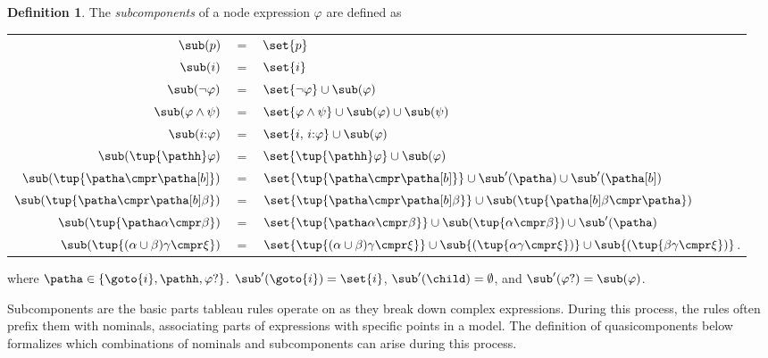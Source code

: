\documentclass[10pt,a4paper]{amsart}
\theoremstyle{definition}
\newtheorem{defi}[thm]{Definition}
\theoremstyle{remark}
\begin{document}
\begin{defi} \label{def:subformulas}
    The \emph{subcomponents} of a node expression $\varphi$ are defined as
        \begin{longtable}{r@{\ }c@{\ }l}
            $\sub(p)$
            & $=$ & $\set{p}$ \\
            $\sub(i)$
            & $=$ & $\set{i}$ \\
            $\sub(\lnot \varphi)$
            & $=$ & $\set{\lnot \varphi} \cup \sub(\varphi)$ \\
            $\sub(\varphi \land \psi)$
            & $=$ & $\set{\varphi \land \psi} \cup \sub(\varphi) \cup \sub({\psi})$  \\            
            $\sub(i{:}\varphi)$
            & $=$ & $\set{i,\, i{:}\varphi} \cup \sub(\varphi)$ \\
            $\sub(\tup{\pathh} \varphi)$ 
            & $=$ & $\set{ \tup{\pathh} \varphi} \cup \sub(\varphi)$ \\  
            $\sub(\tup{ \patha \cmpr \patha[b] })$
            & $=$ & $\set{\tup{ \patha \cmpr \patha[b]}} \cup \sub'(\patha) \cup \sub'(\patha[b])$ \\
            $\sub(\tup{\patha \cmpr \patha[b]\beta})$
            & $=$ & $\set{\tup{\patha \cmpr \patha[b]\beta}} \cup \sub(\tup{\patha[b]\beta \cmpr \patha})$ \\
            $\sub(\tup{\patha\alpha \cmpr \beta})$
            & $=$ & $\set{\tup{\patha\alpha \cmpr \beta}} \cup \sub(\tup{\alpha \cmpr \beta}) \cup \sub'(\patha)$ \\
            $\sub(\tup{ (\alpha \cup \beta) \gamma \cmpr \xi })$
            & $=$ & $\set{\tup{ (\alpha \cup \beta) \gamma \cmpr \xi }} \cup \sub{(\tup{ \alpha \gamma \cmpr \xi })} \cup \sub{(\tup{ \beta \gamma \cmpr \xi })}$.
        \end{longtable}
    where $\patha \in \{\goto{i}, \pathh, \varphi?\}$. %
    $\sub'(\goto{i}) = \set{i}$, $\sub'(\child) = \emptyset$, and $\sub'(\varphi?) = \sub(\varphi)$.
\end{defi}

Subcomponents are the basic parts tableau rules operate on as they break down complex expressions.
During this process, the rules often prefix them with nominals, associating parts of expressions with specific points in a model. The definition of quasicomponents below formalizes which combinations of nominals and subcomponents can arise during this process.
\end{document}
